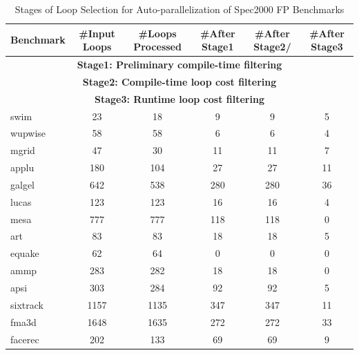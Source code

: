 \begin{table}
\begin{center}
\begin{tabular}{|l|c|c|c|c|c|} \hline
{\rule[-2mm]{0mm}{6mm}\bf Benchmark} & \bf \#Input Loops & \bf \#Loops Processed & \bf \#After Stage1 & \bf \#After Stage2/ & \bf\#After Stage3 \\
\hline
\multicolumn{6}{|c|}{\bf Stage1: Preliminary compile-time filtering }\\
\multicolumn{6}{|c|}{\bf Stage2: Compile-time loop cost filtering  }\\
\multicolumn{6}{|c|}{\bf Stage3: Runtime loop cost filtering  }\\
\hline
\hline
swim & 23 & 18 & 9 & 9 & 5\\
\hline
wupwise & 58 & 58 & 6 & 6 & 4\\ 
\hline
mgrid & 47 & 30 & 11 & 11 & 7\\ 
\hline
applu & 180 & 104 & 27 & 27 & 11\\ 
\hline
galgel & 642 & 538 & 280 & 280 & 36\\ 
\hline
lucas & 123 & 123 & 16 & 16 & 4\\ 
\hline
mesa & 777 & 777 & 118 & 118 & 0\\ 
\hline
art & 83 & 83 & 18 & 18 & 5\\ 
\hline
equake & 62 & 64 &  0 & 0 & 0\\ 
\hline
ammp & 283 & 282 & 18 & 18 & 0\\ 
\hline
apsi & 303 & 284 & 92 & 92 & 5\\ 
\hline
sixtrack & 1157 & 1135 & 347 & 347  & 11 \\ 
\hline
fma3d & 1648 & 1635 & 272 & 272 & 33\\ 
\hline
facerec & 202 & 133 & 69 & 69 & 9\\ 
\hline
\end{tabular}
\vspace{0.5cm}
\caption{\label{autopar_loops}Stages of Loop Selection for Auto-parallelization of Spec2000 FP Benchmarks}
\end{center}
\end{table}

